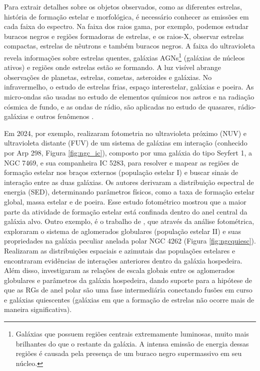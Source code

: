 Para extrair detalhes sobre os objetos observados, como as diferentes estrelas, história de formação estelar e morfológica, é necessário conhecer as emissões em cada faixa do espectro. Na faixa dos raios gama, por exemplo, podemos estudar buracos negros e regiões formadoras de estrelas, e os raios-X, observar estrelas compactas, estrelas de nêutrons e também buracos negros. A faixa do ultravioleta revela informações sobre estrelas quentes, galáxias AGNs\footnote{Galáxias que possuem regiões centrais extremamente luminosas, muito mais brilhantes do que o restante da galáxia. A intensa emissão de energia dessas regiões é causada pela presença de um buraco negro supermassivo em seu núcleo.} (galáxias de núcleos ativos) e regiões onde estrelas estão se formando. A luz visível abrange observações de planetas, estrelas, cometas, asteroides e galáxias. No infravermelho, o estudo de estrelas frias, espaço interestelar, galáxias e poeira. As micro-ondas são usadas no estudo de elementos químicos nos astros e na radiação cósmica de fundo, e as ondas de rádio, são aplicadas no estudo de quasares, rádio-galáxias e outros fenômenos \cite{2023Kepler,2022gastao}.

Em 2024, por exemplo,  realizaram fotometria no ultravioleta próximo (NUV) e ultravioleta distante (FUV) de um sistema de galáxias em interação (conhecido por Arp 298, Figura \ref{fig:ngc_ic}), composto por uma galáxia do tipo Seyfert 1, a NGC 7469, e sua companheira IC 5283, para resolver e mapear as regiões de formação estelar nos braços externos (população estelar I) e buscar sinais de interação entre as duas galáxias. Os autores derivaram a distribuição espectral de energia (SED), determinando parâmetros físicos, como a taxa de formação estelar global, massa estelar e de poeira. Esse estudo fotométrico mostrou que a maior parte da atividade de formação estelar está confinada dentro do anel central da galáxia alvo. Outro exemplo, é o trabalho de , que através da análise fotométrica, exploraram o sistema de aglomerados globulares (população estelar II) e suas propriedades na galáxia peculiar anelada polar NGC 4262 (Figura \ref{fig:ngcquiesc}). Realizaram as distribuições espaciais e azimutais das populações estelares e encontraram evidências de interações anteriores dentro da galáxia hospedeira. Além disso, investigaram as relações de escala globais entre os aglomerados globulares e parâmetros da galáxia hospedeira, dando suporte para a hipótese de que as RGs de anel polar são uma fase intermediária conectando fusões em curso e galáxias quiescentes (galáxias em que a formação de estrelas não ocorre mais de maneira significativa).

